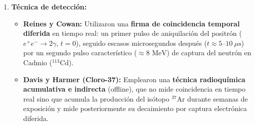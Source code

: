 \begin{problema}
\begin{enumerate}[label=\arabic*.]
    \item \textbf{Técnica de detección:}
    \begin{itemize}
        \item \textbf{Reines y Cowan:} Utilizaron una \textbf{firma de coincidencia temporal diferida} en tiempo real: un primer pulso de aniquilación del positrón ($e^+ e^- \to 2\gamma$, $t=0$), seguido escasos microsegundos después ($t \approx 5\text{--}10\ \mu\text{s}$) por un segundo pulso característico ($\approx 8\text{ MeV}$) de captura del neutrón en Cadmio (${}^{113}\text{Cd}$).
        \item \textbf{Davis y Harmer (Cloro-37):} Emplearon una \textbf{técnica radioquímica acumulativa e indirecta} (offline), que no mide coincidencia en tiempo real sino que acumula la producción del isótopo ${}^{37}\text{Ar}$ durante semanas de exposición y mide posteriormente su decaimiento por captura electrónica diferida.
    \end{itemize}
\end{enumerate}
\end{problema}
\newpage
